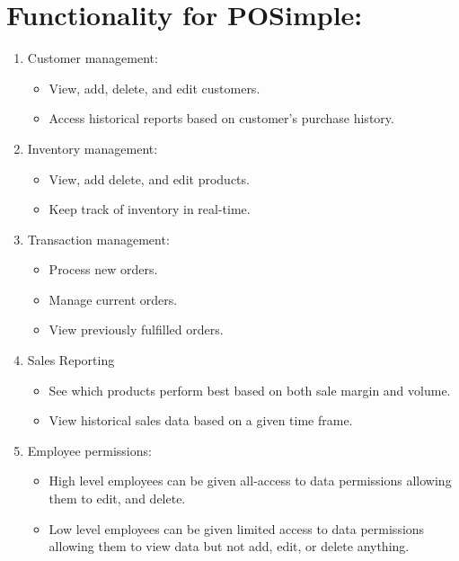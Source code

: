 \documentclass[]{article}
\title{POSimple Software Proposal
\\Group #3}
\author{Adam Beech, Gray Meeks, Luke Nutt, and Russ Seaman}
\begin{document}
\maketitle

\begin{abstract}
	POSimple is an easy to use, intuitive point of sale software solution. The goal of POSimple is to provide businesses of any size with the tools they need to manage customers, inventory, and transactions with optimal efficiency.
\end{abstract}

\section{Functionality for POSimple:}
	\begin{enumerate}
		\item Customer management:
		\begin{itemize}
			\item View, add, delete, and edit customers.
			\item Access historical reports based on customer’s purchase history.
		\end{itemize}
		\item Inventory management:
		\begin{itemize}
			\item View, add delete, and edit products.
			\item Keep track of inventory in real-time.
		\end{itemize}
		\item Transaction management:
		\begin{itemize}
			\item Process new orders.
			\item Manage current orders.
			\item View previously fulfilled orders.
		\end{itemize}
		\item Sales Reporting
		\begin{itemize}
			\item See which products perform best based on both sale margin and volume.
			\item View historical sales data based on a given time frame.
		\end{itemize}
		\item Employee permissions:
		\begin{itemize}
			\item High level employees can be given all-access to data permissions allowing them to edit, and delete.
			\item Low level employees can be given limited access to data permissions allowing them to view data but not add, edit, or delete anything.
		\end{itemize}
	\end{enumerate}
\end{document}
